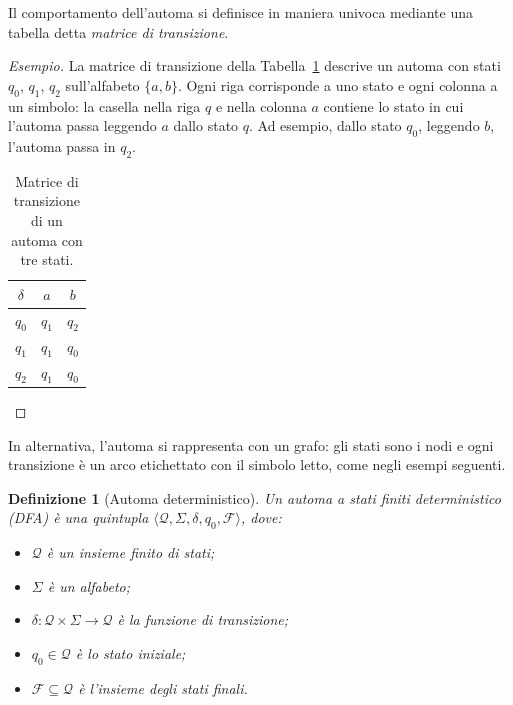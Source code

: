 \documentclass[a4paper, 11pt, oneside]{book}
\theoremstyle{formale}
\newtheorem*{definition}{Definizione}
\newenvironment{esempio}
    {\begin{proof}[\textit{Esempio}]\renewcommand{\qedsymbol}{$\diamond$}}
    {\end{proof}}
\begin{document}
    Il comportamento dell'automa si definisce in maniera univoca mediante una tabella
    detta \emph{matrice di transizione}.

    \begin{esempio}
        La matrice di transizione della Tabella~\ref{tab:matrice} descrive un automa con
        stati $q_0$, $q_1$, $q_2$ sull'alfabeto $\{a, b\}$. Ogni riga corrisponde a uno
        stato e ogni colonna a un simbolo: la casella nella riga $q$ e nella colonna $a$
        contiene lo stato in cui l'automa passa leggendo $a$ dallo stato $q$. Ad esempio,
        dallo stato $q_0$, leggendo $b$, l'automa passa in $q_2$.

        \begin{table}[H]
            \centering
            \begin{tabular}{ccc}
                \toprule
                $\delta$ & $a$ & $b$ \\
                \midrule
                $q_0$ & $q_1$ & $q_2$ \\
                $q_1$ & $q_1$ & $q_0$ \\
                $q_2$ & $q_1$ & $q_0$ \\
                \bottomrule
            \end{tabular}
            \caption{Matrice di transizione di un automa con tre stati.}
            \label{tab:matrice}
        \end{table}
    \end{esempio}

    In alternativa, l'automa si rappresenta con un grafo: gli stati sono i nodi e ogni
    transizione \`e un arco etichettato con il simbolo letto, come negli esempi seguenti.

    \begin{definition}[Automa deterministico]
        Un \emph{automa a stati finiti deterministico} (DFA) \`e una quintupla
        $\langle \mathcal{Q}, \Sigma, \delta, q_0, \mathcal{F} \rangle$, dove:
        \begin{itemize}
            \item $\mathcal{Q}$ \`e un insieme finito di \emph{stati};
            \item $\Sigma$ \`e un alfabeto;
            \item $\delta \colon \mathcal{Q} \times \Sigma \to \mathcal{Q}$ \`e la
                \emph{funzione di transizione};
            \item $q_0 \in \mathcal{Q}$ \`e lo stato \emph{iniziale};
            \item $\mathcal{F} \subseteq \mathcal{Q}$ \`e l'insieme degli stati
                \emph{finali}.
        \end{itemize}
    \end{definition}
\end{document}
